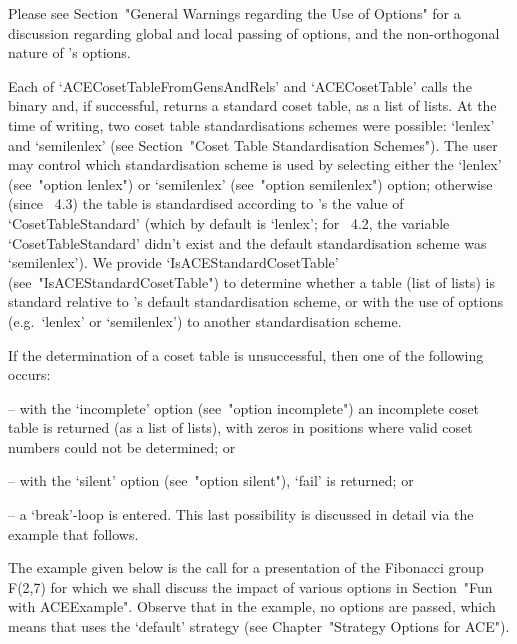 Please see Section~"General Warnings regarding the Use of Options" for
a discussion regarding global and local passing of  options,  and  the
non-orthogonal nature of {\ACE}'s options.

Each of `ACECosetTableFromGensAndRels' and `ACECosetTable'  calls  the
{\ACE} binary and, if successful, returns a standard coset table, as a
{\GAP} list of  lists.  At  the  time  of  writing,  two  coset  table
standardisations schemes were possible: `lenlex' and `semilenlex' (see
Section~"Coset Table Standardisation Schemes"). The user  may  control
which standardisation scheme is used by selecting either the  `lenlex'
(see~"option  lenlex")  or  `semilenlex'   (see~"option   semilenlex")
option;  otherwise  (since  {\GAP}~4.3)  the  table  is   standardised
according to {\GAP}'s the  value  of  `CosetTableStandard'  (which  by
default is `lenlex'; for {\GAP}~4.2, the variable `CosetTableStandard'
didn't exist and the default standardisation scheme was `semilenlex').
We provide  `IsACEStandardCosetTable'  (see~"IsACEStandardCosetTable")
to determine whether a table (list of lists) is standard  relative  to
{\GAP}'s default standardisation scheme, or with the  use  of  options
(e.g.~`lenlex' or `semilenlex') to another standardisation scheme.

If the determination of a coset table is unsuccessful, then one of the
following occurs:

\beginlist%

\item{--} with the `incomplete' option  (see~"option  incomplete")  an
incomplete coset table is returned (as a list of lists), with zeros in
positions where valid coset numbers could not be determined; or

\item{--} with the `silent' option (see~"option  silent"),  `fail'  is
returned; or

\item{--} a  `break'-loop  is  entered.  This  last   possibility   is
discussed in detail via the example that follows.

\endlist

The example given  below  is  the  call  for  a  presentation  of  the
Fibonacci group F(2,7) for  which  we  shall  discuss  the  impact  of
various options in Section~"Fun with ACEExample". Observe that in  the
example, no options are passed,  which  means  that  {\ACE}  uses  the
`default' strategy (see Chapter~"Strategy Options for ACE").

